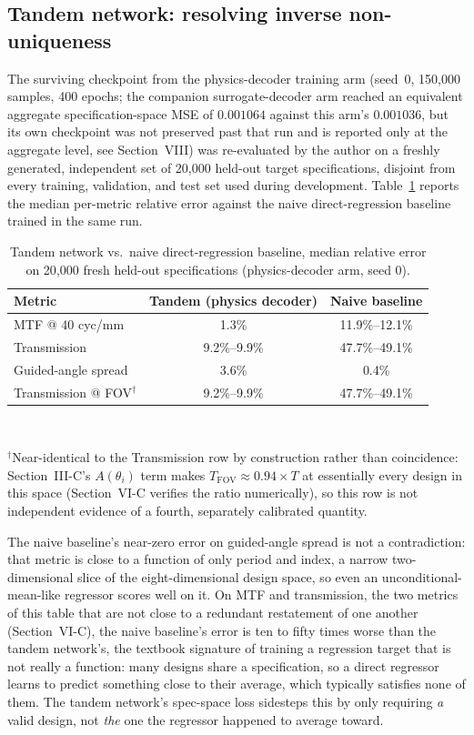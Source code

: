 \documentclass[10pt,twocolumn]{article}
\begin{document}
\subsection{Tandem network: resolving inverse non-uniqueness}
The surviving checkpoint from the physics-decoder training arm (seed~0,
150{,}000 samples, 400 epochs; the companion surrogate-decoder arm reached
an equivalent aggregate specification-space MSE of $0.001064$ against this
arm's $0.001036$, but its own checkpoint was not preserved past that run
and is reported only at the aggregate level, see Section~VIII) was
re-evaluated by the author on a freshly generated, independent set of
20{,}000 held-out target specifications, disjoint from every training,
validation, and test set used during development. Table~\ref{tab:tandem}
reports the median per-metric relative error against the naive
direct-regression baseline trained in the same run.

\begin{table}[t]
\centering
\caption{Tandem network vs.\ naive direct-regression baseline, median relative error on 20{,}000 fresh held-out specifications (physics-decoder arm, seed 0).}
\label{tab:tandem}
\footnotesize
\begin{tabular}{lcc}
\toprule
Metric & Tandem (physics decoder) & Naive baseline \\
\midrule
MTF @ 40 cyc/mm & 1.3\% & 11.9\%--12.1\% \\
Transmission & 9.2\%--9.9\% & 47.7\%--49.1\% \\
Guided-angle spread & 3.6\% & 0.4\% \\
Transmission @ FOV$^\dagger$ & 9.2\%--9.9\% & 47.7\%--49.1\% \\
\bottomrule
\end{tabular}
\\[2pt]
\raggedright\footnotesize $^\dagger$Near-identical to the Transmission row
by construction rather than coincidence: Section~III-C's $A(\theta_i)$
term makes $T_{\mathrm{FOV}}\approx0.94\times T$ at essentially every design
in this space (Section~VI-C verifies the ratio numerically), so this row is
not independent evidence of a fourth, separately calibrated quantity.
\end{table}

The naive baseline's near-zero error on guided-angle spread is not a
contradiction: that metric is close to a function of only period and
index, a narrow two-dimensional slice of the eight-dimensional design
space, so even an unconditional-mean-like regressor scores well on it. On
MTF and transmission, the two metrics of this table that are not close
to a redundant restatement of one another (Section~VI-C),
the naive baseline's error is ten to fifty times worse than
the tandem network's, the textbook signature of training a regression
target that is not really a function: many designs share a specification,
so a direct regressor learns to predict something close to their average,
which typically satisfies none of them. The tandem network's spec-space
loss sidesteps this by only requiring \emph{a} valid design, not
\emph{the} one the regressor happened to average toward.
\end{document}
